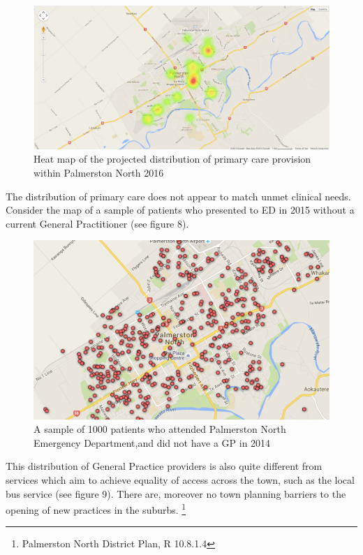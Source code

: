 \documentclass[11pt,a4paper]{article}
\begin{document}
\begin{figure}[htp]
\centering
\includegraphics[scale=0.30]{fig7.png}
\caption{Heat map of the projected distribution of primary care provision within Palmerston North 2016}
\label{Heat map of the projected distribution of primary care provision within Palmerston North 2016}
\end{figure}

The distribution of primary care does not appear to match unmet clinical needs.  Consider the map of a sample of patients who presented to ED in 2015 without a current General Practitioner (see figure 8).\\

\begin{figure}[htp]
\centering
\includegraphics[scale=0.30]{fig8.png}
\caption{A sample of 1000 patients who attended Palmerston North Emergency Department,and did not have a GP in 2014}
\label{Distribution of patients with a General Practitioner}
\end{figure}

This distribution of General Practice providers is also quite different from services which aim to achieve equality of access across the town, such as the local bus service (see figure 9). There are, moreover no town planning barriers to the opening of new practices in the suburbs. \footnote{Palmerston North District Plan, R 10.8.1.4}  \\
\end{document}
